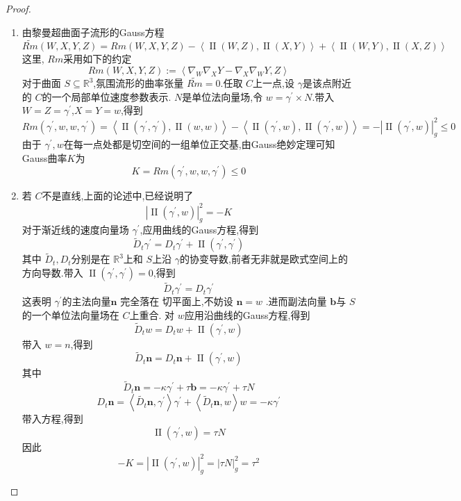\documentclass[../../main.tex]{subfiles}
\begin{document}
\begin{proof}
    \begin{enumerate}
        \item 由黎曼超曲面子流形的Gauss方程 \[
    \tilde{Rm}\left( W,X,Y,Z \right)= Rm\left( W,X,Y,Z \right)-\left<\operatorname{II} \left( W,Z \right),\operatorname{II} \left( X,Y \right)   \right>+ \left<\operatorname{II} \left( W,Y \right),\operatorname{II} \left( X,Z \right)   \right>  
    \]这里, \(  Rm  \)采用如下的约定 \[
    Rm\left( W,X,Y,Z \right):= \left< \nabla _{W} \nabla _{X}Y- \nabla _{X} \nabla _{W}Y,Z \right> 
    \] 对于曲面 \(  S\subseteq \mathbb{R} ^{3}  \),氛围流形的曲率张量 \(  \tilde{Rm}= 0  \).任取 \(  C  \)上一点,设 \(   \gamma   \)是该点附近的 \(  C  \)的一个局部单位速度参数表示.  \(  N  \)是单位法向量场,令 \(  w=  \gamma ^{\prime} \times N  \).带入 \(  W= Z=  \gamma ^{\prime}   \),\(  X= Y= w  \),得到 \[
    Rm\left(  \gamma ^{\prime} ,w,w, \gamma ^{\prime}  \right)= \left<\operatorname{II} \left(  \gamma ^{\prime} , \gamma ^{\prime}  \right),\operatorname{II} \left( w,w \right)   \right>-\left<\operatorname{II} \left(  \gamma ^{\prime} ,w \right),\operatorname{II} \left(  \gamma ^{\prime} ,w \right)   \right>= -\left| \operatorname{II} \left(  \gamma ^{\prime} ,w \right)  \right|_{g}^{2}\le 0  
    \]    由于 \(   \gamma ^{\prime} ,w  \)在每一点处都是切空间的一组单位正交基,由Gauss绝妙定理可知Gauss曲率\(  K  \)为 \[
    K= Rm\left(  \gamma ^{\prime} ,w,w, \gamma ^{\prime}  \right) \le 0
    \]   
    
    \item 若 \(  C  \)不是直线,上面的论述中,已经说明了 \[
    \left| \operatorname{II} \left(  \gamma ^{\prime} ,w \right)  \right|_{g}^{2}= -K 
    \] 对于渐近线的速度向量场 \(   \gamma ^{\prime}   \),应用曲线的Gauss方程,得到 \[
    \tilde{D}_{t} \gamma ^{\prime} = D_{t} \gamma ^{\prime} + \operatorname{II} \left(  \gamma ^{\prime} , \gamma ^{\prime}  \right) 
    \] 其中 \(  \tilde{D}_{t},D _{t} \)分别是在 \(  \mathbb{R} ^{3}  \)上和 \(  S  \)上沿 \(   \gamma   \)的协变导数,前者无非就是欧式空间上的方向导数.带入 \(  \operatorname{II} \left(  \gamma ^{\prime} , \gamma ^{\prime}  \right)= 0   \),得到 \[
    \tilde{D}_{t} \gamma ^{\prime} = D_{t} \gamma ^{\prime} 
    \]     这表明 \(   \gamma ^{\prime}   \)的主法向量\(  \mathbf{n}  \) 完全落在 切平面上,不妨设 \(  \mathbf{n}= w  \) .进而副法向量 \(  \mathbf{b} \)与 \(  S  \)的一个单位法向量场在 \(  C  \)上重合.  对 \(  w  \)应用沿曲线的Gauss方程,得到\[
    \tilde{D}_{t}w= D_{t}w+ \operatorname{II} \left(  \gamma ^{\prime} ,w \right) 
    \] 带入 \(  w= n  \),得到 \[
    \tilde{D}_{t}\mathbf{n}= D_{t}\mathbf{n}+ \operatorname{II} \left(  \gamma ^{\prime} ,w \right) 
    \] 其中 \[
    \tilde{D}_{t}\mathbf{n}= - \kappa  \gamma ^{\prime} + \tau \mathbf{b}= - \kappa  \gamma ^{\prime} + \tau N
    \] \[
    D_{t}\mathbf{n}= \left<\tilde{D_{t}} \mathbf{n}, \gamma ^{\prime}  \right> \gamma ^{\prime} + \left<\tilde{D}_{t} \mathbf{n},w\right>w= - \kappa  \gamma ^{\prime} 
    \]带入方程,得到 \[
    \operatorname{II} \left(  \gamma ^{\prime} ,w \right)= \tau N 
    \]因此 \[
    -K= \left| \operatorname{II} \left(  \gamma ^{\prime} ,w \right)  \right|_{g}^{2}= \left| \tau N \right|_{g}^{2}= \tau ^{2}  
    \]
    \end{enumerate}
    


\end{proof}
\end{document}
